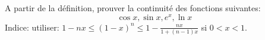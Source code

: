 
\begin{exercice}\label{exo0031}


A partir de la définition, prouver la continuité des fonctions suivantes:
\[
	\cos x, \sin x, e^x, \ln x
\]
Indice: utiliser: $ 1-nx\leq(1-x)^n\leq 1 - \frac{nx}{1+(n-1)x}$ si $0<x<1$.

\end{exercice}
